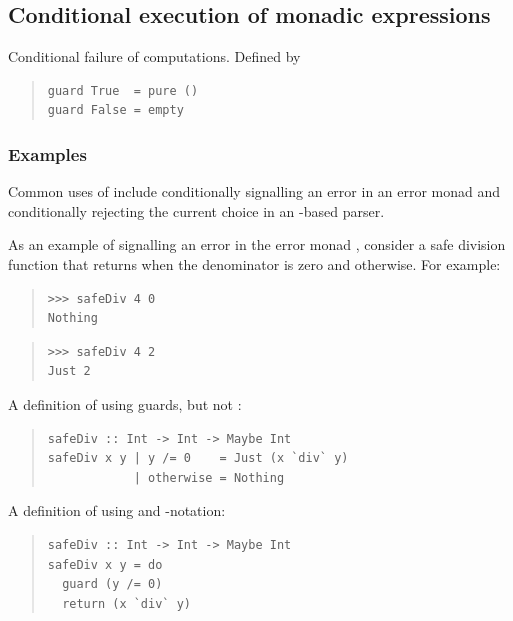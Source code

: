 \subsection{Conditional execution of monadic expressions}
\begin{haddockdesc}
\item[\begin{tabular}{@{}l}
guard :: Alternative f => Bool -> f ()
\end{tabular}]
{\haddockbegindoc
Conditional failure of  computations. Defined by\par
\begin{quote}
{\haddockverb\begin{verbatim}
guard True  = pure ()
guard False = empty
\end{verbatim}}
\end{quote}
\subsubsection*{\textbf{Examples}}
Common uses of  include conditionally signalling an error in
 an error monad and conditionally rejecting the current choice in an
 -based parser.\par
As an example of signalling an error in the error monad ,
 consider a safe division function  that returns
  when the denominator  is zero and  otherwise. For example:\par
\begin{quote}
{\haddockverb\begin{verbatim}
>>> safeDiv 4 0
Nothing

\end{verbatim}}
\end{quote}
\begin{quote}
{\haddockverb\begin{verbatim}
>>> safeDiv 4 2
Just 2

\end{verbatim}}
\end{quote}
A definition of  using guards, but not :\par
\begin{quote}
{\haddockverb\begin{verbatim}
safeDiv :: Int -> Int -> Maybe Int
safeDiv x y | y /= 0    = Just (x `div` y)
            | otherwise = Nothing
\end{verbatim}}
\end{quote}
A definition of  using  and  -notation:\par
\begin{quote}
{\haddockverb\begin{verbatim}
safeDiv :: Int -> Int -> Maybe Int
safeDiv x y = do
  guard (y /= 0)
  return (x `div` y)
\end{verbatim}}
\end{quote}}
\end{haddockdesc}
